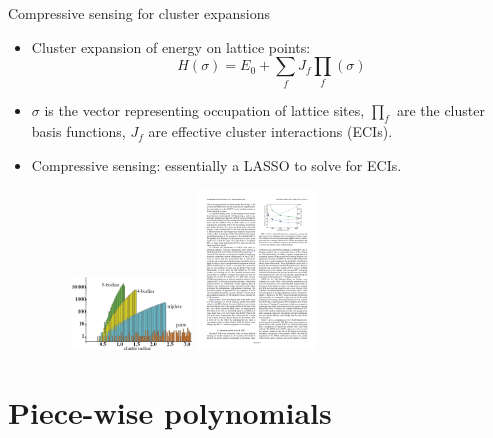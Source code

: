 \documentclass[aspectratio=169]{beamer}
\begin{document}
\begin{frame}{Compressive sensing for cluster expansions}
    \begin{itemize}
        \item Cluster expansion of energy on lattice points:
        \begin{equation*}
            H(\sigma) = E_0 + \sum_f J_f \prod_f(\sigma)
        \end{equation*}
        \item $\sigma$ is the vector representing occupation of lattice sites, $\prod_f$ are the cluster basis functions, $J_f$ are effective cluster interactions (ECIs).
        \item Compressive sensing: essentially a LASSO to solve for ECIs.\cite{nelsonCompressiveSensingParadigm2013}
        \begin{figure}
            \centering
            \includegraphics[width=0.3\textwidth]{figures/numberofclusters.png}
            \includegraphics[width=0.3\textwidth]{figures/ecifit.pdf}
        \end{figure}
    \end{itemize}
\end{frame} 

\section{Piece-wise polynomials}
\end{document}

